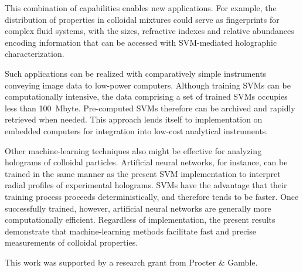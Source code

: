 This combination of capabilities enables new applications.
For example, the distribution of properties in colloidal mixtures
could serve as fingerprints for complex fluid systems, with the
sizes, refractive indexes and relative abundances encoding information
that can be accessed with SVM-mediated holographic
characterization.

Such applications can be realized with comparatively
simple instruments \cite{krishnatreya14} conveying image data
to low-power computers.
Although training SVMs can be computationally intensive,
the data comprising a set of trained SVMs occupies less
than \SI{100}{\mega byte}.
Pre-computed SVMs therefore can be archived and rapidly
retrieved when needed.
This approach lends itself to
implementation on embedded computers for integration into
low-cost analytical instruments.

Other machine-learning techniques also might be effective
for analyzing holograms of colloidal particles.  Artificial
neural networks, for instance, can be trained in the same
manner as the present SVM implementation to interpret
radial profiles of experimental holograms.  SVMs have the advantage
that their training process proceeds deterministically, and therefore
tends to be faster.  Once successfully trained, however, artificial
neural networks are generally more computationally efficient.
Regardless of implementation, the present results demonstrate
that machine-learning methods facilitate
fast and precise measurements of colloidal properties.

This work was supported by a research grant from Procter \& Gamble.
